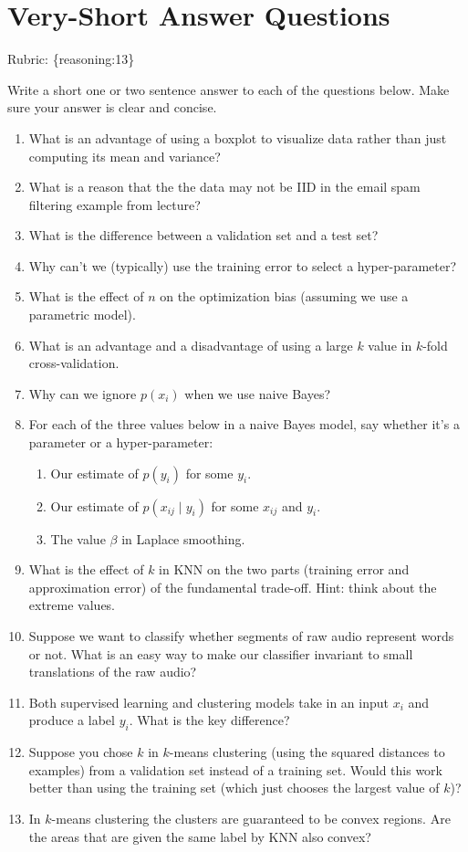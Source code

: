 \documentclass{article}
\def\rubric#1{\gre{Rubric: \{#1\}}}{}
\def\blu#1{{\color{blu}#1}}
\def\gre#1{{\color{gre}#1}}
\def\cond{\; | \;}
\def\enum#1{\begin{enumerate}#1\end{enumerate}}
\begin{document}
\section{Very-Short Answer Questions}
\rubric{reasoning:13}

\blu{Write a short one or two sentence answer to each of the questions below}. Make sure your answer is clear and concise.

\enum{
\item What is an advantage of using a boxplot to visualize data rather than just computing its mean and variance?
\item What is a reason that the the data may not be IID in the email spam filtering example from lecture?
\item What is the difference between a validation set and a test set?
\item Why can't we (typically) use the training error to select a hyper-parameter?
\item What is the effect of $n$ on the optimization bias (assuming we use a parametric model).
\item What is an advantage and a disadvantage of using a large $k$ value in $k$-fold cross-validation.
\item Why can we ignore $p(x_i)$ when we use naive Bayes?
\item For each of the three values below in a naive Bayes model, say whether it's a parameter or a hyper-parameter:
\begin{enumerate}
\item Our estimate of $p(y_i)$ for some $y_i$.
\item Our estimate of $p(x_{ij} \cond y_i)$ for some $x_{ij}$ and $y_i$.
\item The value $\beta$ in Laplace smoothing.
\end{enumerate}
\item What is the effect of $k$ in KNN on the two parts (training error and approximation error) of the fundamental trade-off. Hint: think about the extreme values.
\item Suppose we want to classify whether segments of raw audio represent words or not. What is an easy way to make our classifier invariant to small translations of the raw audio?
\item Both supervised learning and clustering models take in an input $x_i$ and produce a label $y_i$. What is the key difference?
\item Suppose you chose $k$ in $k$-means clustering (using the squared distances to examples) from a validation set instead of a training set. Would this work better than using the training set (which just chooses the largest value of $k$)?
\item In $k$-means clustering the clusters are guaranteed to be convex regions. Are the areas that are given the same label by KNN also convex?
}
\end{document}
